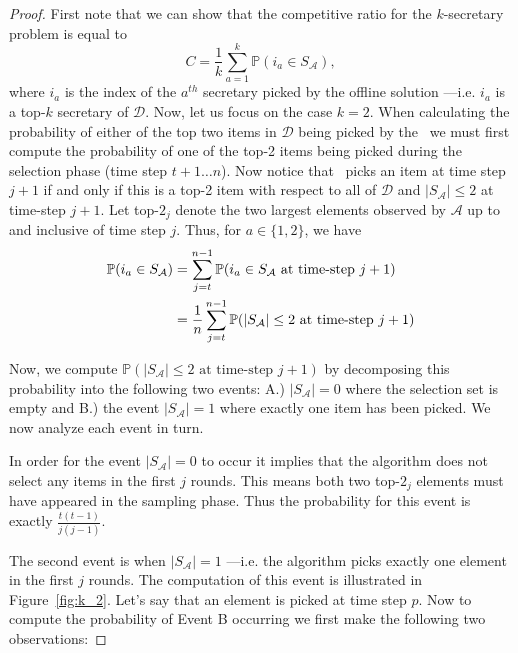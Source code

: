 \begin{proof}
First note that we can show that the competitive ratio for the $k$-secretary problem is equal to 
\begin{equation}
    C = \frac{1}{k}\sum_{a=1}^k \mathbb{P}(i_a \in S_\mathcal{A}), \label{eq:C_as_sum_prob1}
\end{equation}
where $i_a$ is the index of the $a^{th}$ secretary picked by the offline solution ---i.e. $i_a$ is a top-$k$ secretary of $\mathcal{D}$. 
Now, let us focus on the case $k=2$.
When calculating the probability of either of the top two items in $\mathcal{D}$ being picked by the \algoname\ we must first compute the probability of one of the top-2 items being picked during the selection phase (time step $t+1 \dots n$). Now notice that \algoname\ picks an item at time step $j+1$ if and only if this is a top-2 item with respect to all of $\mathcal{D}$ and $|S_{\mathcal{A}}| \leq 2$ at time-step $j+1$. Let top-$2_j$ denote the two largest elements observed by $\mathcal{A}$ up to and inclusive of time step $j$. Thus, for $a \in \{1,2\}$, we have
\begin{align}
    \mathbb{P}(i_a \in S_\mathcal{A}) 
    &= \sum_{j=t}^{n-1} \mathbb{P}(i_a \in S_\mathcal{A} \text{ at time-step }j+1) \label{p_picked_equal_not_filled} \\
    &= \frac{1}{n}\sum_{j=t}^{n-1} \mathbb{P}(|S_{\mathcal{A}}| \leq 2 \text{ at time-step } j + 1) \notag
\end{align}

Now, we compute $\mathbb{P}(|S_{\mathcal{A}}| \leq 2 \text{ at time-step } j+1)$ by decomposing this probability into the following two events: A.) $|S_{\mathcal{A}}| = 0$ where the selection set is empty and B.) the event $|S_{\mathcal{A}}| = 1$ where exactly one item has been picked. We now analyze each event in turn.

 In order for the event $|S_{\mathcal{A}}|=0$ to occur it implies that the algorithm does not select any items in the first $j$ rounds. This means both two top-$2_j$ elements must have appeared in the sampling phase. Thus the probability for this event is exactly $\frac{t(t - 1)}{j (j - 1)}$. 

The second event is when $|S_{\mathcal{A}}|=1$ ---i.e. the algorithm picks exactly one element in the first $j$ rounds. The computation of this event is illustrated in Figure~\ref{fig:k_2}. Let's say that an element is picked at time step $p$. Now to compute the probability of Event B occurring we first make the following two observations:


\end{proof}
